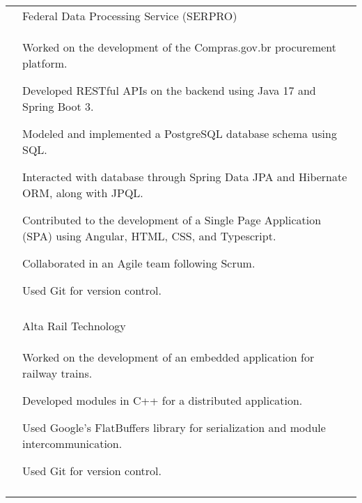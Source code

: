 \documentclass[a4paper,12pt]{article}
\begin{document}
\begin{longtable}{r|p{14.3cm}}
 & \large{Federal Data Processing Service (SERPRO)} \\*
 &\small{
    \begin{itemize*}[label=\Large\textbullet]
        \item Worked on the development of the Compras.gov.br procurement platform.
        \item \mbox{Developed} RESTful APIs on the backend using Java 17 and Spring Boot 3.
        \item \mbox{Modeled} and implemented a \mbox{PostgreSQL} database schema using SQL.
        \item \mbox{Interacted} with database through Spring Data JPA and Hibernate ORM, along with JPQL.
        \item \mbox{Contributed} to the development of a Single Page Application (SPA) using Angular, HTML, CSS, and Typescript.
        \item Collaborated in an Agile team following Scrum.
        \item Used Git for version control.
     \end{itemize*}
}
 \\ \\

 & \large{Alta Rail Technology} \\*
 &\small{
    \begin{itemize*}[label=\Large\textbullet]
        \item Worked on the development of an embedded application for railway trains.
        \item \mbox{Developed} modules in C++ for a distributed application.
        \item Used Google's FlatBuffers library for \mbox{serialization} and module intercommunication.
        \item Used Git for version control.
     \end{itemize*}
 }
 \\ \\


\end{longtable}
\end{document}
